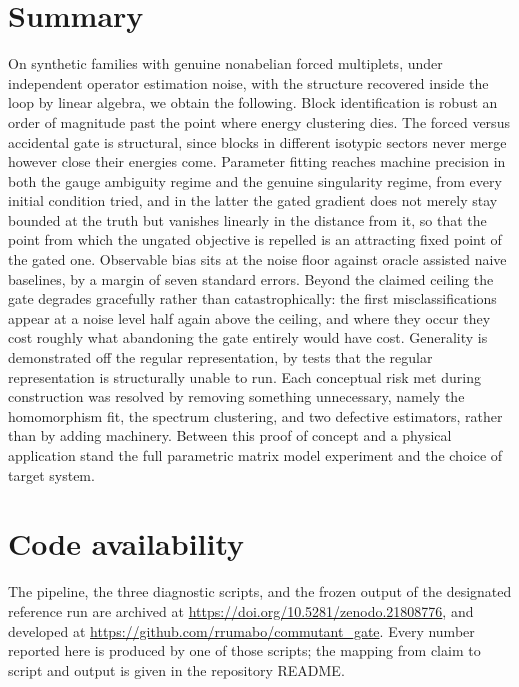 \documentclass[11pt]{article}
\begin{document}
\section{Summary}
On synthetic families with genuine nonabelian forced multiplets, under
independent operator estimation noise, with the structure recovered inside the
loop by linear algebra, we obtain the following. Block identification is robust an
order of magnitude past the point where energy clustering dies. The forced versus
accidental gate is structural, since blocks in different isotypic sectors never
merge however close their energies come. Parameter fitting reaches machine
precision in both the gauge ambiguity regime and the genuine singularity regime,
from every initial condition tried, and in the latter the gated gradient does not
merely stay bounded at the truth but vanishes linearly in the distance from it,
so that the point from which the ungated objective is repelled is an attracting
fixed point of the gated one. Observable bias sits at the noise floor against
oracle assisted naive baselines, by a margin of seven standard errors. Beyond the
claimed ceiling the gate degrades gracefully rather than catastrophically: the
first misclassifications appear at a noise level half again above the ceiling,
and where they occur they cost roughly what abandoning the gate entirely would
have cost. Generality is demonstrated off the regular representation, by tests
that the regular representation is structurally unable to run. Each conceptual
risk met during construction was resolved by removing something unnecessary,
namely the homomorphism fit, the spectrum clustering, and two defective
estimators, rather than by adding machinery. Between this proof of concept and a
physical application stand the full parametric matrix model experiment and the
choice of target system.

\section*{Code availability}
The pipeline, the three diagnostic scripts, and the frozen output of the
designated reference run are archived at
\url{https://doi.org/10.5281/zenodo.21808776}, and developed at
\url{https://github.com/rrumabo/commutant_gate}. Every number reported here is
produced by one of those scripts; the mapping from claim to script and output is
given in the repository README.
\end{document}

